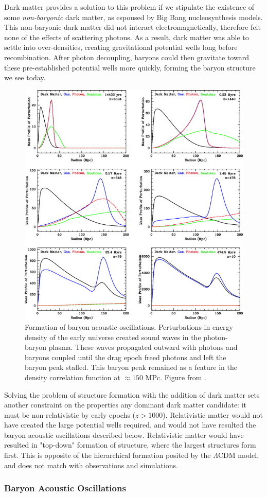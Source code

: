 \documentclass{report}
\begin{document}
Dark matter provides a solution to this problem if we stipulate the existence of some \emph{non-baryonic} dark matter, as espoused by Big Bang nucleosynthesis models. This non-baryonic dark matter did not interact electromagnetically, therefore felt none of the effects of scattering photons. As a result, dark matter was able to settle into over-densities, creating gravitational potential wells long before recombination. After photon decoupling, baryons could then gravitate toward these pre-established potential wells more quickly, forming the baryon structure we see today.

\begin{figure}
\centering
\includegraphics[width=.4\textwidth]{BAO_propagation.jpg}
\caption{Formation of baryon acoustic oscillations. Perturbations in energy density of the early universe created sound waves in the photon-baryon plasma. These waves propagated outward with photons and baryons coupled until the drag epoch freed photons and left the baryon peak stalled. This baryon peak remained as a feature in the density correlation function at $\approx 150$ MPc. Figure from \cite{Eisenstein2007}. }
\end{figure}

Solving the problem of structure formation with the addition of dark matter sets another constraint on the properties any dominant dark matter candidate: it must be non-relativistic by early epochs ($z > 1000$). Relativistic matter would not have created the large potential wells required, and would not have resulted the baryon acoustic oscillations described below. Relativistic matter would have resulted in "top-down" formation of structure, where the largest structures form first. This is opposite of the hierarchical formation posited by the $\Lambda$CDM model, and does not match with observations and simulations.


\subsubsection{Baryon Acoustic Oscillations}
\end{document}
